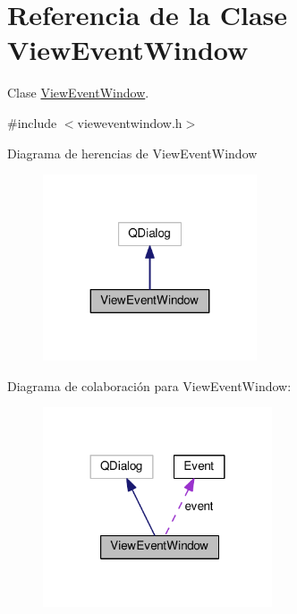 \hypertarget{class_view_event_window}{}\section{Referencia de la Clase View\+Event\+Window}
\label{class_view_event_window}


Clase \hyperlink{class_view_event_window}{View\+Event\+Window}.  




{\ttfamily \#include $<$vieweventwindow.\+h$>$}



Diagrama de herencias de View\+Event\+Window\nopagebreak
\begin{figure}[H]
\begin{center}
\leavevmode
\includegraphics[width=179pt]{class_view_event_window__inherit__graph}
\end{center}
\end{figure}


Diagrama de colaboración para View\+Event\+Window\+:\nopagebreak
\begin{figure}[H]
\begin{center}
\leavevmode
\includegraphics[width=192pt]{class_view_event_window__coll__graph}
\end{center}
\end{figure}
